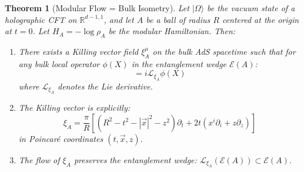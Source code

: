 \documentclass[12pt,a4paper]{article}
\newtheorem{theorem}{Theorem}[section]
\begin{document}
\begin{theorem}[Modular Flow = Bulk Isometry]\label{thm:modular-diffeo}
Let $|\Omega\rangle$ be the vacuum state of a holographic CFT on $\mathbb{R}^{d-1,1}$, and let $A$ be a ball of radius $R$ centered at the origin at $t=0$. Let $H_A = -\log \rho_A$ be the modular Hamiltonian. Then:
\begin{enumerate}
    \item There exists a Killing vector field $\xi_A^\mu$ on the bulk AdS spacetime such that for any bulk local operator $\phi(X)$ in the entanglement wedge $\mathcal{E}(A)$:
    \begin{equation}
    [\phi(X), H_A] = i\mathcal{L}_{\xi_A}\phi(X)
    \end{equation}
    where $\mathcal{L}_{\xi_A}$ denotes the Lie derivative.
    
    \item The Killing vector is explicitly:
    \begin{equation}
    \xi_A = \frac{\pi}{R}\left[(R^2 - t^2 - |\vec{x}|^2 - z^2)\partial_t + 2t(x^i\partial_i + z\partial_z)\right]
    \end{equation}
    in Poincar\'e coordinates $(t, \vec{x}, z)$.
    
    \item The flow of $\xi_A$ preserves the entanglement wedge: $\mathcal{L}_{\xi_A}(\mathcal{E}(A)) \subset \mathcal{E}(A)$.
\end{enumerate}
\end{theorem}
\end{document}

